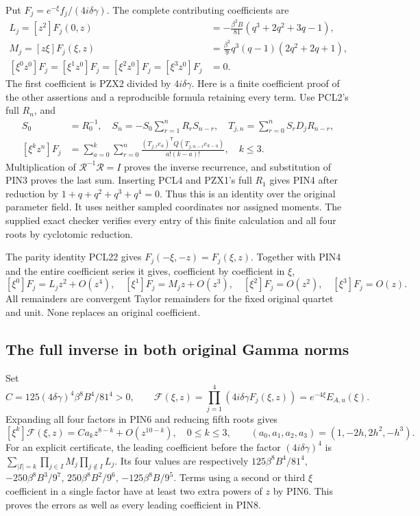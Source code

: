 \documentclass[11pt]{article}
\begin{document}
Put $F_j=e^{-\xi}f_j/(4i\delta\gamma)$. The complete contributing
coefficients are
\[
 \begin{split}
 L_j=[z^2]F_j(0,z)&=-\frac{\beta^2B}{81}
                         (q^3+2q^2+3q-1),\\
 M_j=[z\xi]F_j(\xi,z)&=\frac{\beta^2}{9}
                         q^3(q-1)(2q^2+2q+1),\\
 [\xi^0z^0]F_j=[\xi^1z^0]F_j
   =[\xi^2z^0]F_j=[\xi^3z^0]F_j&=0.
 \end{split}\tag{PIN4}
\]
The first coefficient is PZX2 divided by $4i\delta\gamma$.
Here is a finite coefficient proof of the other assertions and a
reproducible formula retaining every term. Use PCL2's full $R_n$, and
\[
 \begin{aligned}
 S_0&=R_0^{-1},\quad
 S_n=-S_0\sum_{r=1}^nR_rS_{n-r},\quad
 T_{j,n}=\sum_{r=0}^n S_rD_jR_{n-r},\\
 [\xi^kz^n]F_j&=
 \sum_{a=0}^k\sum_{r=0}^n
 \frac{(T_{j,r}e_a)^{\mathsf T}Q(T_{j,n-r}e_{k-a})}
      {a!(k-a)!},\quad k\le3.
 \end{aligned}
 \tag{PIN5}
\]
Multiplication of $\mathcal R^{-1}\mathcal R=I$ proves the inverse
recurrence, and substitution of PIN3 proves the last sum. Inserting
PCL4 and PZX1's full $R_1$ gives PIN4 after reduction by
$1+q+q^2+q^3+q^4=0$. Thus this is an identity over the original
parameter field. It uses neither sampled coordinates nor assigned
moments. The supplied exact checker verifies every entry of this
finite calculation and all four roots by cyclotomic reduction.

The parity identity PCL22 gives
$F_j(-\xi,-z)=F_j(\xi,z)$. Together with PIN4 and the entire
coefficient series it gives, coefficient by coefficient in $\xi$,
\[
 [\xi^0]F_j=L_jz^2+O(z^4),\quad
 [\xi^1]F_j=M_jz+O(z^3),\quad
 [\xi^2]F_j=O(z^2),\quad [\xi^3]F_j=O(z).
 \tag{PIN6}
\]
All remainders are convergent Taylor remainders for the fixed original
quartet and unit. None replaces an original coefficient.

\subsection{The full inverse in both original Gamma norms}
Set
\[
 C=125(4\delta\gamma)^4\beta^8B^4/81^4>0,\qquad
 \mathcal F(\xi,z)=\prod_{j=1}^4(4i\delta\gamma F_j(\xi,z))
                         =e^{-4\xi}E_{A,u}(\xi).
 \tag{PIN7}
\]
Expanding all four factors in PIN6 and reducing fifth roots gives
\[
 [\xi^k]\mathcal F(\xi,z)
 =C a_kz^{8-k}+O(z^{10-k}),\quad 0\le k\le3,
 \qquad (a_0,a_1,a_2,a_3)=(1,-2h,2h^2,-h^3).
 \tag{PIN8}
\]
For an explicit certificate, the leading coefficient before the
factor $(4i\delta\gamma)^4$ is
$\sum_{|I|=k}\prod_{j\in I}M_j\prod_{j\notin I}L_j$.
Its four values are respectively
$125\beta^8B^4/81^4$,
$-250\beta^8B^3/9^7$,
$250\beta^8B^2/9^6$,
$-125\beta^8B/9^5$.
Terms using a second or third $\xi$ coefficient in a single factor
have at least two extra powers of $z$ by PIN6. This proves the errors
as well as every leading coefficient in PIN8.
\end{document}
